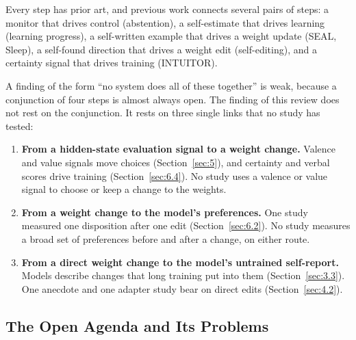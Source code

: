 \documentclass[journal]{IEEEtran}
\begin{document}
Every step has prior art, and previous work connects several pairs of steps: a monitor that drives control (abstention), a self-estimate that drives learning (learning progress), a self-written example that drives a weight update (SEAL, Sleep), a self-found direction that drives a weight edit (self-editing), and a certainty signal that drives training (INTUITOR).

A finding of the form ``no system does all of these together'' is weak, because a conjunction of four steps is almost always open. The finding of this review does not rest on the conjunction. It rests on three single links that no study has tested:
\begin{enumerate}
\item \textbf{From a hidden-state evaluation signal to a weight change.} Valence and value signals move choices (Section~\ref{sec:5}), and certainty and verbal scores drive training (Section~\ref{sec:6.4}). No study uses a valence or value signal to choose or keep a change to the weights.
\item \textbf{From a weight change to the model's preferences.} One study measured one disposition after one edit (Section~\ref{sec:6.2}). No study measures a broad set of preferences before and after a change, on either route.
\item \textbf{From a direct weight change to the model's untrained self-report.} Models describe changes that long training put into them (Section~\ref{sec:3.3}). One anecdote and one adapter study bear on direct edits (Section~\ref{sec:4.2}).
\end{enumerate}

\subsection{The Open Agenda and Its Problems}\label{sec:9.2}
\end{document}
